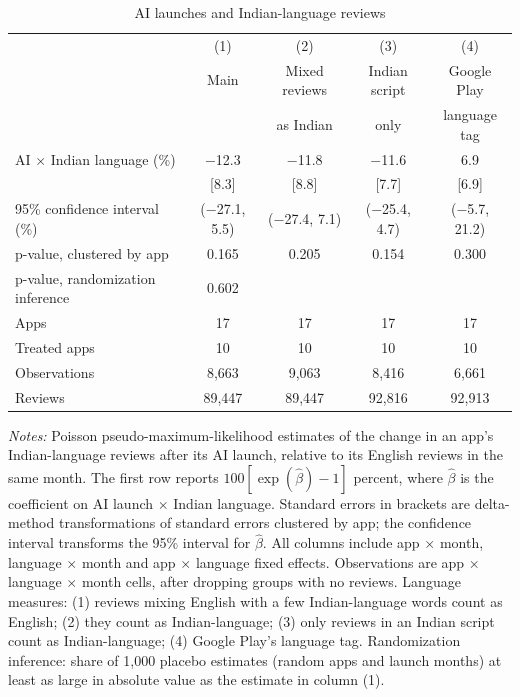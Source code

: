\begin{table}[htbp]
\centering
\begin{threeparttable}
\caption{AI launches and Indian-language reviews}
\label{tab:main}
\begin{tabular}{@{}lcccc@{}}
\toprule
 & (1) & (2) & (3) & (4) \\
 & Main & Mixed reviews & Indian script & Google Play \\
 &  & as Indian & only & language tag \\
\midrule
AI $\times$ Indian language (\%) & $-$12.3 & $-$11.8 & $-$11.6 & 6.9 \\
 & [8.3] & [8.8] & [7.7] & [6.9] \\
95\% confidence interval (\%) & ($-$27.1, 5.5) & ($-$27.4, 7.1) & ($-$25.4, 4.7) & ($-$5.7, 21.2) \\
p-value, clustered by app & 0.165 & 0.205 & 0.154 & 0.300 \\
p-value, randomization inference & 0.602 &  &  &  \\
\midrule
Apps & 17 & 17 & 17 & 17 \\
Treated apps & 10 & 10 & 10 & 10 \\
Observations & 8,663 & 9,063 & 8,416 & 6,661 \\
Reviews & 89,447 & 89,447 & 92,816 & 92,913 \\
\bottomrule
\end{tabular}
\begin{tablenotes}[flushleft]
\footnotesize
\item \textit{Notes:} Poisson pseudo-maximum-likelihood estimates of the change in an app's Indian-language reviews after its AI launch, relative to its English reviews in the same month. The first row reports $100[\exp(\hat\beta)-1]$ percent, where $\hat\beta$ is the coefficient on AI launch $\times$ Indian language. Standard errors in brackets are delta-method transformations of standard errors clustered by app; the confidence interval transforms the 95\% interval for $\hat\beta$. All columns include app $\times$ month, language $\times$ month and app $\times$ language fixed effects. Observations are app $\times$ language $\times$ month cells, after dropping groups with no reviews. Language measures: (1) reviews mixing English with a few Indian-language words count as English; (2) they count as Indian-language; (3) only reviews in an Indian script count as Indian-language; (4) Google Play's language tag. Randomization inference: share of 1,000 placebo estimates (random apps and launch months) at least as large in absolute value as the estimate in column (1).
\end{tablenotes}
\end{threeparttable}
\end{table}
